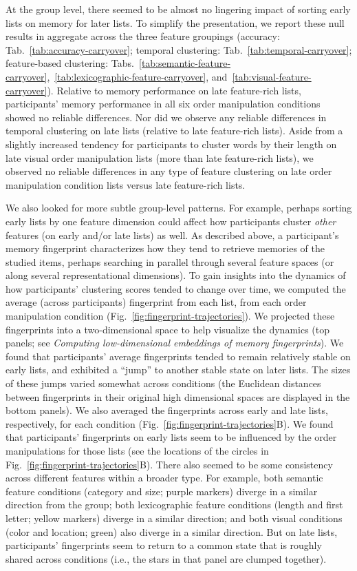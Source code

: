 \documentclass[11pt]{article}
\begin{document}
At the group level, there seemed to be almost no lingering impact of sorting
early lists on memory for later lists. To simplify the presentation, we report
these null results in aggregate across the three feature groupings (accuracy:
Tab.~\ref{tab:accuracy-carryover}; temporal clustering:
Tab.~\ref{tab:temporal-carryover}; feature-based clustering:
Tabs.~\ref{tab:semantic-feature-carryover},~\ref{tab:lexicographic-feature-carryover},
and~\ref{tab:visual-feature-carryover}). Relative to memory performance on late
feature-rich lists, participants' memory performance in all six order
manipulation conditions showed no reliable differences. Nor did we observe any
reliable differences in temporal clustering on late lists (relative to late
feature-rich lists). Aside from a slightly increased tendency for participants
to cluster words by their length on late visual order manipulation lists (more
than late feature-rich lists), we observed no reliable differences in any type
of feature clustering on late order manipulation condition lists versus late
feature-rich lists.

We also looked for more subtle group-level patterns. For example, perhaps
sorting early lists by one feature dimension could affect how participants
cluster \textit{other} features (on early and/or late lists) as well. As
described above, a participant's memory fingerprint characterizes how they tend
to retrieve memories of the studied items, perhaps searching in parallel
through several feature spaces (or along several representational dimensions).
To gain insights into the dynamics of how participants' clustering scores
tended to change over time, we computed the average (across participants)
fingerprint from each list, from each order manipulation condition
(Fig.~\ref{fig:fingerprint-trajectories}). We projected these fingerprints into
a two-dimensional space to help visualize the dynamics (top panels; see
\textit{Computing low-dimensional embeddings of memory fingerprints}). We found
that participants' average fingerprints tended to remain relatively stable on
early lists, and exhibited a ``jump'' to another stable state on later lists.
The sizes of these jumps varied somewhat across conditions (the Euclidean
distances between fingerprints in their original high dimensional spaces are
displayed in the bottom panels). We also averaged the fingerprints across early
and late lists, respectively, for each condition
(Fig.~\ref{fig:fingerprint-trajectories}B). We found that participants'
fingerprints on early lists seem to be influenced by the order manipulations
for those lists (see the locations of the circles in
Fig.~\ref{fig:fingerprint-trajectories}B). There also seemed to be some
consistency across different features within a broader type. For example, both
semantic feature conditions (category and size; purple markers) diverge in a
similar direction from the group; both lexicographic feature conditions (length
and first letter; yellow markers) diverge in a similar direction; and both
visual conditions (color and location; green) also diverge in a similar
direction. But on late lists, participants' fingerprints seem to return to a
common state that is roughly shared across conditions (i.e., the stars in that
panel are clumped together).
\end{document}
